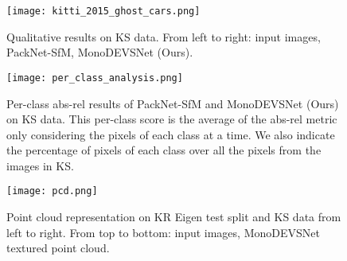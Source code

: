 \documentclass[journal]{IEEEtran}
\begin{document}
\begin{figure}
    \centering
    \texttt{[image: kitti\_2015\_ghost\_cars.png]}
    \caption{Qualitative results on KS data. From left to right: input images, PackNet-SfM, MonoDEVSNet  (Ours).}
    \label{fig:kitti_2015_ghost_cars_qualitative}
\end{figure}

\begin{figure}
    \centering
    \texttt{[image: per\_class\_analysis.png]}
    \caption{Per-class abs-rel results of PackNet-SfM and MonoDEVSNet (Ours) on KS data. This per-class score is the average of the abs-rel metric only considering the pixels of each class at a time. We also indicate the percentage of pixels of each class over all the pixels from the images in KS.}
    \label{fig:per_class_analysis}
\end{figure}


\begin{figure}
    \centering
    \texttt{[image: pcd.png]}
    \caption{Point cloud representation on KR Eigen test split \cite{Eigen:2014} and KS data from left to right. From top to bottom: input images, MonoDEVSNet textured point cloud.}
    \label{fig:pcd_representation}
\end{figure}
\end{document}
